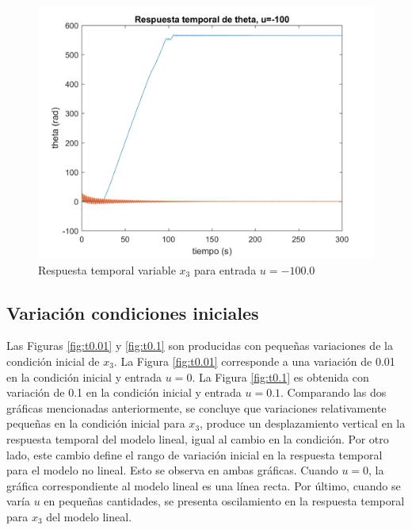 \documentclass[journal]{IEEEtran}
\begin{document}
\begin{figure}[h!]
\caption{Respuesta temporal variable $x_3$ para entrada $u=-100.0$\label{fig:u-100}}
  \centering
\includegraphics[scale=0.19]{Graficaslvsnl/u-100.png}
\end{figure}
       
\subsection{Variación condiciones iniciales}
Las Figuras \ref{fig:t0.01} y \ref{fig:t0.1} son producidas con pequeñas variaciones de la condición inicial de $x_3$. La Figura \ref{fig:t0.01} corresponde a una variación de 0.01 en la condición inicial y entrada $u=0$. La Figura \ref{fig:t0.1} es obtenida con variación de 0.1 en la condición inicial y entrada $u=0.1$. Comparando las dos gráficas mencionadas anteriormente, se concluye que variaciones relativamente pequeñas en la condición inicial para $x_3$, produce un desplazamiento vertical en la respuesta temporal del modelo lineal, igual al cambio en la condición. Por otro lado, este cambio define el rango de variación inicial en la respuesta temporal para el modelo no lineal. Esto se observa en ambas gráficas. Cuando $u=0$, la gráfica correspondiente al modelo lineal es una línea recta. Por último, cuando se varía $u$ en pequeñas cantidades, se presenta oscilamiento en la respuesta temporal para $x_3$ del modelo lineal.
\end{document}
